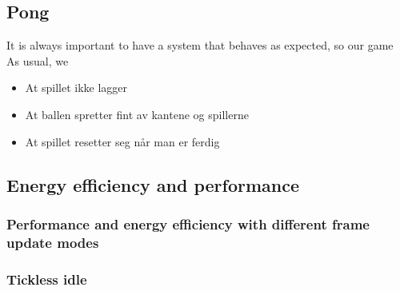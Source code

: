 \subsection{Pong}
\label{subsection:pong-testing}
It is always important to have a system that behaves as expected, so our game 
As usual, we 
\begin{itemize}
	\item At spillet ikke lagger
	\item At ballen spretter fint av kantene og spillerne
	\item At spillet resetter seg når man er ferdig
\end{itemize}

\subsection{Energy efficiency and performance}

\subsubsection{Performance and energy efficiency with different frame update modes}

\subsubsection{Tickless idle}
